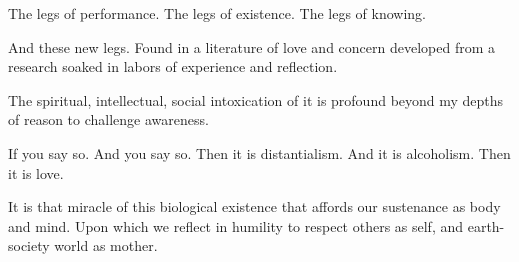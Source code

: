 

The legs of performance.
The legs of existence.
The legs of knowing.

And these new legs.  Found in a literature of love and concern
developed from a research soaked in labors of experience and
reflection.

The spiritual, intellectual, social intoxication of it is profound
beyond my depths of reason to challenge awareness.

If you say so.  And you say so.  Then it is distantialism.  And it is
alcoholism.  Then it is love.

It is that miracle of this biological existence that affords our
sustenance as body and mind.  Upon which we reflect in humility to
respect others as self, and earth-society world as mother.  

\bye
